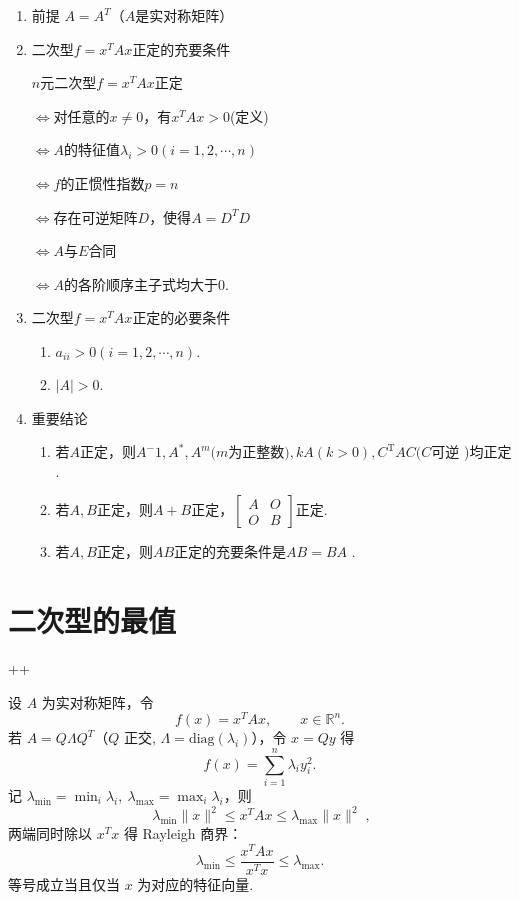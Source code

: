 \begin{enumerate}
    \item 前提
          $A=A^T$（$A$是实对称矩阵）
    \item 二次型$f=x^TAx$正定的充要条件 \DTwo

          $n$元二次型$f=x^{T}Ax$正定

          $\Leftrightarrow$对任意的$x\neq 0$，有$x^{T}Ax>0$(定义)

          $\Leftrightarrow A$的特征值$\lambda_{i}>0(i=1,2,\cdots,n)$

          $\Leftrightarrow f$的正惯性指数$p=n$

          $\Leftrightarrow$存在可逆矩阵$D$，使得$A=D^{T}D$

          $\Leftrightarrow A$与$E$合同

          $\Leftrightarrow A$的各阶顺序主子式均大于0.
    \item 二次型$f=x^TAx$正定的必要条件
          \begin{enumerate}
              \item $a_{ii}>0\left(i=1,2,\cdots,n\right).$
              \item $| A| > 0$.
          \end{enumerate}
    \item 重要结论
          \begin{enumerate}
              \item 若$A$正定，则$A^-1,A^{*},A^{m}(m$为正整数$),kA(k>0),C^{\mathrm{T}}AC(C$可逆 )均正定 .

              \item 若$A,B$正定，则$A+B$正定，$\begin{bmatrix}A&O\\O&B\end{bmatrix}$正定.

              \item ${\text{若}A,B}$正定，则$AB$正定的充要条件是$AB= BA$ .
          \end{enumerate}

\end{enumerate}

\section{二次型的最值}
\DOne+\DTwoTwo+\DTwoThree

设 $A$ 为实对称矩阵，令
\[
    f(x)=x^T A x,\qquad x\in\mathbb R^n.
\]
若 $A=Q\Lambda Q^T$（$Q$ 正交, $\Lambda=\mathrm{diag}(\lambda_i)$），令 $x=Qy$ 得
\[
    f(x)=\sum_{i=1}^n\lambda_i y_i^2.
\]
记 $\lambda_{\min}=\min_i\lambda_i,\ \lambda_{\max}=\max_i\lambda_i$，则
\[
    \boxed{\;\lambda_{\min}\|x\|^2 \le x^TAx \le \lambda_{\max}\|x\|^2\;},
\]
两端同时除以 $x^Tx$ 得 Rayleigh 商界：
\[
    \lambda_{\min}\le \frac{x^TAx}{x^Tx}\le \lambda_{\max}.
\]
等号成立当且仅当 $x$ 为对应的特征向量.

